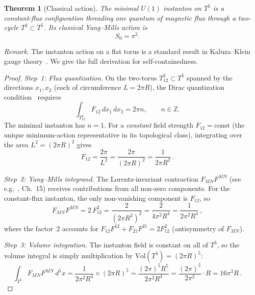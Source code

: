 \documentclass[11pt,a4paper]{article}
\newtheorem{theorem}{Theorem}
\theoremstyle{definition}
\theoremstyle{remark}
\begin{document}
\begin{theorem}[Classical action]\label{thm:action}
The minimal $U(1)$ instanton on $T^5$ is a constant-flux configuration
threading one quantum of magnetic flux through a two-cycle
$T^2\subset T^5$.  Its classical Yang--Mills action is
\begin{equation}
  S_0 = \pi^2.
\end{equation}
\end{theorem}

\noindent\emph{Remark.}
The instanton action on a flat torus is a standard result in Kaluza--Klein
gauge theory~\cite{Toms1983,DaviesMcLachlan1989}.  We give the full
derivation for self-containedness.

\begin{proof}
\emph{Step~1: Flux quantization.}
On the two-torus $T^2_{12}\subset T^5$ spanned by the directions
$x_1,x_2$ (each of circumference $L=2\pi R$), the Dirac quantization
condition~\cite{Belavin1975} requires
\begin{equation}\label{eq:fluxquant}
  \int_{T^2_{12}} F_{12}\,dx_1\,dx_2 = 2\pi n, \qquad n\in\mathbb{Z}.
\end{equation}
The minimal instanton has $n=1$.  For a \emph{constant} field strength
$F_{12}=\mathrm{const}$ (the unique minimum-action representative in its
topological class), integrating over the area $L^2=(2\pi R)^2$ gives
\begin{equation}\label{eq:F12value}
  F_{12} = \frac{2\pi}{L^2} = \frac{2\pi}{(2\pi R)^2}
  = \frac{1}{2\pi R^2}\,.
\end{equation}

\emph{Step~2: Yang--Mills integrand.}
The Lorentz-invariant contraction $F_{MN}F^{MN}$
(see e.g.~\cite{PeskinSchroeder1995}, Ch.~15) receives contributions
from all non-zero components.  For the constant-flux instanton, the only
non-vanishing component is $F_{12}$, so
\begin{equation}\label{eq:F2}
  F_{MN}F^{MN} = 2\,F_{12}^2
  = \frac{2}{(2\pi R^2)^2}
  = \frac{2}{4\pi^2 R^4}
  = \frac{1}{2\pi^2 R^4}\,,
\end{equation}
where the factor~2 accounts for $F_{12}F^{12}+F_{21}F^{21}=2F_{12}^2$
(antisymmetry of $F_{MN}$).

\emph{Step~3: Volume integration.}
The instanton field is constant on all of $T^5$, so the volume integral
is simply multiplication by $\mathrm{Vol}(T^5)=(2\pi R)^5$:
\begin{equation}\label{eq:volumeint}
  \int_{T^5}F_{MN}F^{MN}\,d^5x
  = \frac{1}{2\pi^2 R^4}\times(2\pi R)^5
  = \frac{(2\pi)^5 R^5}{2\pi^2 R^4}
  = \frac{(2\pi)^5}{2\pi^2}\cdot R
  = 16\pi^3 R\,.
\end{equation}


\end{proof}
\end{document}
